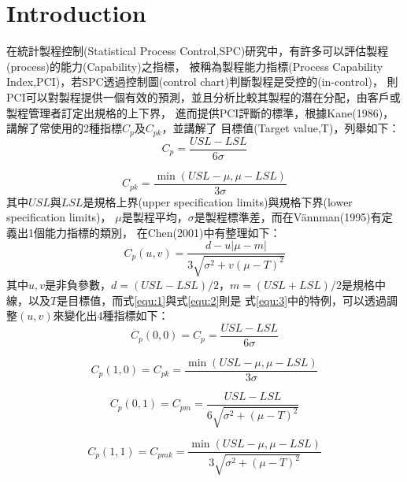 \chapter{Introduction}
\label{chapter:intro}

在統計製程控制(Statistical Process Control,SPC)研究中，有許多可以評估製程(process)的能力(Capability)之指標，
被稱為製程能力指標(Process Capability Index,PCI)，若SPC透過控制圖(control chart)判斷製程是受控的(in-control)，
則PCI可以對製程提供一個有效的預測，並且分析比較其製程的潛在分配，由客戶或製程管理者訂定出規格的上下界，
進而提供PCI評斷的標準，根據Kane(1986)\cite{Kane_1986}，講解了常使用的2種指標$C_{p}$及$C_{pk}$，並講解了
目標值(Target value,T)，列舉如下：
\begin{equation}\label{equ:1}
    C_{p}=\frac{USL-LSL}{6\sigma}
\end{equation}

\begin{equation}\label{equ:2}
    C_{pk}=\frac{\min(USL-\mu, \mu-LSL)}{3\sigma}
\end{equation}
其中$USL$與$LSL$是規格上界(upper specification limits)與規格下界(lower specification limits)，
$\mu$是製程平均，$\sigma$是製程標準差，而在Vännman(1995)\cite{Vannman_1995}有定義出1個能力指標的類別，
在Chen(2001)\cite{Chen_2001}中有整理如下：
\begin{equation}\label{equ:3}
    C_{p}(u, v)=\frac{d-u|\mu-m|}{3\sqrt{\sigma^{2}+v(\mu-T)^{2}}}
\end{equation}
其中$u,v$是非負參數，$d=(USL-LSL)/2$，$m=(USL+LSL)/2$是規格中線，以及$T$是目標值，而式\ref{equ:1}與式\ref{equ:2}則是
式\ref{equ:3}中的特例，可以透過調整$(u,v)$來變化出4種指標如下：
\begin{equation}\label{equ:4}
    C_{p}(0, 0)= C_{p}=\frac{USL-LSL}{6\sigma}
\end{equation}

\begin{equation}\label{equ:5}
    C_{p}(1, 0)=C_{pk}=\frac{\min(USL-\mu, \mu-LSL)}{3\sigma}
\end{equation}

\begin{equation}\label{equ:6}
    C_{p}(0, 1)=C_{pm}=\frac{USL-LSL}{6\sqrt{\sigma^{2}+(\mu-T)^{2}}}
\end{equation}

\begin{equation}\label{equ:7}
    C_{p}(1, 1)=C_{pmk}=\frac{\min(USL-\mu, \mu-LSL)}{3\sqrt{\sigma^{2}+(\mu-T)^{2}}}
\end{equation}

